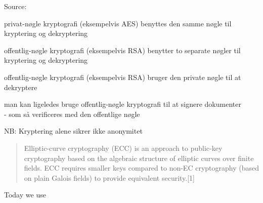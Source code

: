 \documentclass[Screen16to9,17pt]{foils}
\begin{document}
Source: 





\begin{list1}
\item privat-nøgle kryptografi (eksempelvis AES) benyttes den samme
  nøgle til kryptering og dekryptering
\item offentlig-nøgle kryptografi (eksempelvis RSA) benytter to
  separate nøgler til kryptering og dekryptering
\end{list1}



\begin{list1}
\item offentlig-nøgle kryptografi (eksempelvis RSA) bruger den private
  nøgle til at dekryptere
\item man kan ligeledes bruge offentlig-nøgle kryptografi til at
  signere dokumenter\\ - som så verificeres med den offentlige nøgle
\item NB: Kryptering alene sikrer ikke anonymitet
\end{list1}



\begin{quote}
Elliptic-curve cryptography (ECC) is an approach to public-key cryptography based on the algebraic structure of elliptic curves over finite fields. ECC requires smaller keys compared to non-EC cryptography (based on plain Galois fields) to provide equivalent security.[1]
\end{quote}

\begin{list2}
\item Today we use 
\end{list2}




\end{document}
